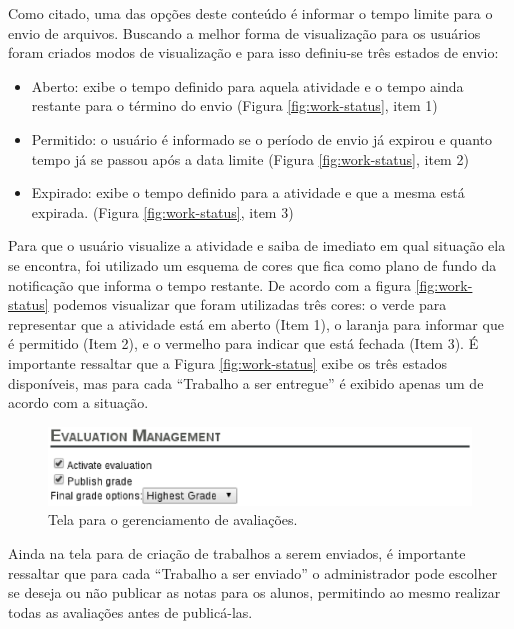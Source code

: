 Como citado, uma das opções deste conteúdo é informar o tempo limite para o envio de arquivos. Buscando a melhor forma de visualização para os usuários foram criados modos de visualização e para isso definiu-se três estados de envio:

\begin{itemize}
\item Aberto: exibe o tempo definido para aquela atividade e o tempo ainda restante para o término do envio (Figura \ref{fig:work-status}, item 1)
\item Permitido: o usuário é informado se o período de envio já expirou e quanto tempo já se passou após a data limite (Figura \ref{fig:work-status}, item 2)
\item Expirado: exibe o tempo definido para a atividade e que a mesma está expirada. (Figura \ref{fig:work-status}, item 3)
\end{itemize}

Para que o usuário visualize a atividade e saiba de imediato em qual situação ela se encontra, foi utilizado um esquema de cores que fica como plano de fundo da notificação que informa o tempo restante. De acordo com a figura \ref{fig:work-status} podemos visualizar que foram utilizadas três cores: o verde para representar que a atividade está em aberto (Item 1), o laranja para informar que é permitido (Item 2), e o vermelho para indicar que está fechada (Item 3). É importante ressaltar que a Figura \ref{fig:work-status} exibe os três estados disponíveis, mas para cada ``Trabalho a ser entregue'' é exibido apenas um de acordo com a situação.

\begin{figure}[h]
    \centering
    \includegraphics[keepaspectratio=true,scale=0.75]
      {figuras/evaluation-management.eps}
    \caption{Tela para o gerenciamento de avaliações.}
    \label{fig:evaluation-management}
\end{figure}

Ainda na tela para de criação de trabalhos a serem enviados, é importante ressaltar que para cada ``Trabalho a ser enviado'' o administrador pode escolher se deseja ou não publicar as notas para os alunos, permitindo ao mesmo realizar todas as avaliações antes de publicá-las.

